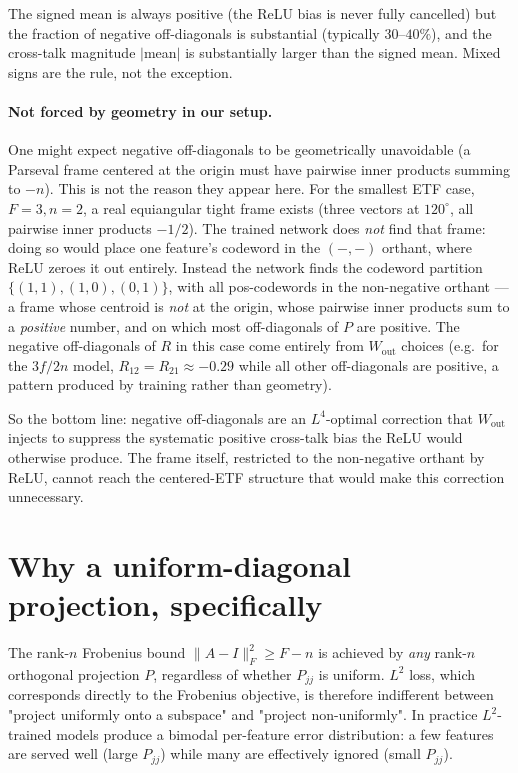 \documentclass[11pt]{article}
\begin{document}
The signed mean is always positive (the ReLU bias is never fully
cancelled) but the fraction of negative off-diagonals is substantial
(typically $30\text{--}40\%$), and the cross-talk magnitude $|$mean$|$ is
substantially larger than the signed mean. Mixed signs are the rule, not
the exception.

\paragraph{Not forced by geometry in our setup.} One might expect negative
off-diagonals to be geometrically unavoidable (a Parseval frame centered
at the origin must have pairwise inner products summing to $-n$). This is
not the reason they appear here. For the smallest ETF case, $F=3, n=2$, a
real equiangular tight frame exists (three vectors at $120^\circ$, all
pairwise inner products $-1/2$). The trained network does \emph{not} find
that frame: doing so would place one feature's codeword in the $(-,-)$
orthant, where ReLU zeroes it out entirely. Instead the network finds the
codeword partition $\{(1,1), (1,0), (0,1)\}$, with all pos-codewords in
the non-negative orthant — a frame whose centroid is \emph{not} at the
origin, whose pairwise inner products sum to a \emph{positive} number,
and on which most off-diagonals of $P$ are positive. The negative
off-diagonals of $R$ in this case come entirely from $W_{\mathrm{out}}$
choices (e.g.\ for the $3f/2n$ model, $R_{12} = R_{21} \approx -0.29$
while all other off-diagonals are positive, a pattern produced by
training rather than geometry).

So the bottom line: negative off-diagonals are an $L^4$-optimal
correction that $W_{\mathrm{out}}$ injects to suppress the systematic
positive cross-talk bias the ReLU would otherwise produce. The frame
itself, restricted to the non-negative orthant by ReLU, cannot reach the
centered-ETF structure that would make this correction unnecessary.

\section{Why a uniform-diagonal projection, specifically}

The rank-$n$ Frobenius bound $\|A - I\|_F^2 \ge F - n$ is achieved by
\emph{any} rank-$n$ orthogonal projection $P$, regardless of whether
$P_{jj}$ is uniform. $L^2$ loss, which corresponds directly to the Frobenius
objective, is therefore indifferent between "project uniformly onto a
subspace" and "project non-uniformly". In practice $L^2$-trained models
produce a bimodal per-feature error distribution: a few features are served
well (large $P_{jj}$) while many are effectively ignored (small $P_{jj}$).
\end{document}
